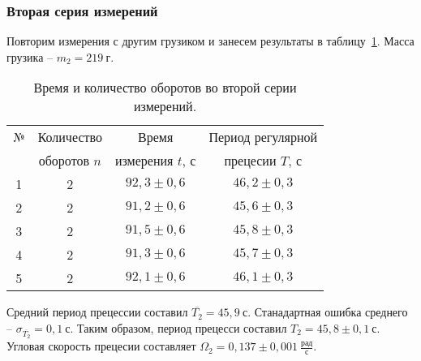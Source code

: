 \documentclass[a4paper,11pt]{article}
\begin{document}
\subsubsection{Вторая серия измерений} %
Повторим измерения с другим грузиком и занесем результаты в таблицу~\ref{table:tab2}.\newline
Масса грузика -- $m_{2} = 219\ г$.
\begin{table}[h!]
\centering
\begin{tabular}{ ||c|c|c|c|| }
  \hline
  № & Количество & Время & Период регулярной \\
   & оборотов $n$ & измерения $t$, $с$ & прецесии $T$, $с$ \\
  \hline
  1 & 2 & $92,3 \pm 0,6$ & $46,2 \pm 0,3$ \\
  2 & 2 & $91,2 \pm 0,6$ & $45,6 \pm 0,3$ \\
  3 & 2 & $91,5 \pm 0,6$ & $45,8 \pm 0,3$ \\
  4 & 2 & $91,3 \pm 0,6$ & $45,7 \pm 0,3$ \\
  5 & 2 & $92,1 \pm 0,6$ & $46,1 \pm 0,3$ \\
  \hline
\end{tabular}
\caption{Время и количество оборотов во второй серии измерений.}
\label{table:tab2}
\end{table}\newline
Средний период прецессии составил $\overline{T_{2}} = 45,9\ с$.\newline
Станадартная ошибка среднего -- $\sigma_{\overline{T_{2}}}= 0,1\ с$.\newline
Таким образом, период прецесси составил $T_{2} = 45,8 \pm 0,1\ с$.\newline
Угловая скорость прецесии составляет $\Omega_{2} = 0,137 \pm 0,001\ \frac{рад}{с}$.
\end{document}
